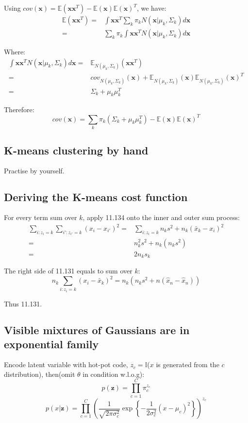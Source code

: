 \documentclass[UTF8]{ctexart}
\begin{document}
Using $cov(\textbf{x})=\mathbb{E}(\textbf{x}\textbf{x}^{T})-\mathbb{E}(\textbf{x})\mathbb{E}(\textbf{x})^{T}$, we have:
\begin{align}
\mathbb{E}(\textbf{x}\textbf{x}^{T})=&\int \textbf{x}\textbf{x}^{T}\sum_{k}\pi_{k}N(\textbf{x}|\mu_{k},\Sigma_{k})d\textbf{x}\nonumber \\
=&\sum_{k}\pi_{k}\int \textbf{x}\textbf{x}^{T}N(\textbf{x}|\mu_{k},\Sigma_{k})d\textbf{x}\nonumber
\end{align}

Where:
\begin{align}
\int \textbf{x}\textbf{x}^{T}N(\textbf{x}|\mu_{k},\Sigma_{k})d\textbf{x}=&\mathbb{E}_{N(\mu_{k},\Sigma_{k})}(\textbf{x}\textbf{x}^{T})\nonumber \\
=&cov_{N(\mu_{k},\Sigma_{k})}(\textbf{x})+\mathbb{E}_{N(\mu_{k},\Sigma_{k})}(\textbf{x})\mathbb{E}_{N(\mu_{k},\Sigma_{k})}(\textbf{x})^{T} \nonumber \\
=&\Sigma_{k}+\mu_{k}\mu_{k}^{T}\nonumber
\end{align}

Therefore:
$$cov(\textbf{x})=\sum_{k}\pi_{k}(\Sigma_{k}+\mu_{k}\mu_{k}^{T})-\mathbb{E}(\textbf{x})\mathbb{E}(\textbf{x})^{T}$$

\subsection{K-means clustering by hand}
Practise by yourself.

\subsection{Deriving the K-means cost function}
For every term sum over $k$, apply 11.134 onto the inner and outer sum process:
\begin{align}
\sum_{i:z_{i}=k}\sum_{i':z_{i'}=k}(x_{i}-x_{i'})^{2}=&\sum_{i:z_{i}=k}n_{k}s^{2}+n_{k}(\bar{x}_{k}-x_{i})^{2}\nonumber \\
=& n_{k}^{2}s^{2}+n_{k}(n_{k}s^{2})\nonumber \\
=& 2n_{k}s_{k}\nonumber
\end{align}

The right side of 11.131 equals to sum over $k$:
$$n_{k}\sum_{i:z_{i}=k}(x_{i}-\bar{x}_{k})^{2}=n_{k}(n_{k}s^{2}+n(\hat{x}_{n}-\hat{x}_{n}))$$

Thus 11.131.

\subsection{Visible mixtures of Gaussians are in exponential family}
Encode latent variable with hot-pot code, $z_{c}=\mathbb{I}$($x$ is generated from the $c$ distribution), then(omit $\theta$ in condition w.l.o.g):
$$p(\textbf{z})=\prod_{c=1}^{C}\pi_{c}^{z_{c}}$$
$$p(x|\textbf{z})=\prod_{c=1}^{C}(\frac{1}{\sqrt{2\pi \sigma_{c}^{2}}}\exp\left\{ -\frac{1}{2\sigma_{c}^{2}}(x-\mu_{c})^{2} \right\})^{z_{c}}$$
\end{document}
